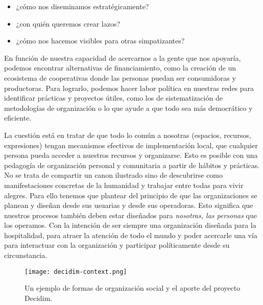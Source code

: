 \begin{itemize}
	\item ¿cómo nos diseminamos estratégicamente?
	\item ¿con quién queremos crear lazos?
	\item ¿cómo nos hacemos visibles para otras simpatizantes?
\end{itemize}

En función de nuestra capacidad de acercarnos a la gente que nos apoyaría, podemos encontrar alternativas de financiamiento, como la creación de un ecosistema de cooperativas donde las personas puedan ser consumidoras y productoras. Para lograrlo, podemos hacer labor política en nuestras redes para identificar prácticas y proyectos útiles, como los de sistematización de metodologías de organización o lo que ayude a que todo sea más democrático y eficiente.

La cuestión está en tratar de que todo lo común a nosotras (espacios, recursos, expresiones) tengan mecanismos efectivos de implementación local, que cualquier persona pueda acceder a nuestros recursos y organizarse. Esto es posible con una pedagogía de organización personal y comunitaria a partir de hábitos y prácticas. No se trata de compartir un canon ilustrado sino de descubrirse como manifestaciones concretas de la humanidad y trabajar entre todas para vivir alegres. Para ello tenemos que plantear del principio de que las organizaciones se planean y diseñan desde sus usuarias y desde sus operadoras. Esto significa que nuestros procesos también deben estar diseñados para \emph{nosotras, las personas} que los operamos. Con la intención de ser siempre una organización diseñada para la hospitalidad, para atraer la atención de todo el mundo y poder acercarle una vía para interactuar con la organización y participar políticamente desde su circunstancia.

\begin{figure}[htbp]
	\centering
	\texttt{[image: decidim-context.png]}
	\caption[Proyecto Decidim.]{Un ejemplo de formas de organización social y el aporte del proyecto Decidim.}
	\label{fig:decidim}
\end{figure}

